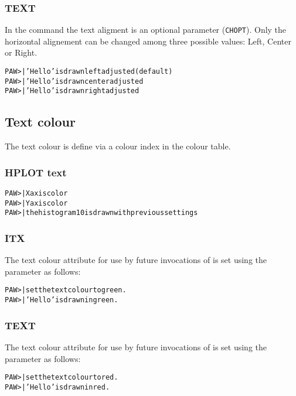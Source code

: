 \subsubsection{TEXT}
In the command  the text aligment is an optional parameter
(\texttt{CHOPT}). Only the horizontal alignement can be changed among three 
possible values: Left, Center or Right.
\begin{alltt}
PAW >  | 'Hello' is drawn left adjusted (default)
PAW >  | 'Hello' is drawn center adjusted
PAW >  | 'Hello' is drawn right adjusted
\end{alltt}

\subsection*{Text colour}
The text colour is define via a colour index in the colour table.
\subsubsection{HPLOT text}
\begin{alltt}
PAW >     | X axis color
PAW >     | Y axis color
PAW >  | the histogram 10 is drawn with previous settings
\end{alltt}
\subsubsection{ITX}
The text colour attribute for use by future invocations of 
 is set using the  parameter as follows:
\begin{alltt}
PAW >     | set the text colour to green.
PAW >  | 'Hello' is drawn in green.
\end{alltt}
\subsubsection{TEXT}
The text colour attribute for use by future invocations of 
 is set using the  parameter as follows:
\begin{alltt}
PAW >        | set the text colour to red.
PAW >  | 'Hello' is drawn in red.
\end{alltt}

